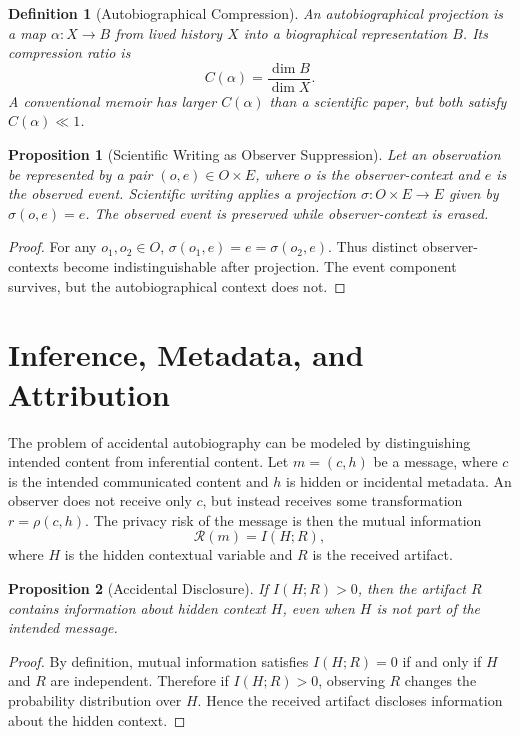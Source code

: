 \documentclass[11pt]{article}
\theoremstyle{plain}
\newtheorem{definition}{Definition}[section]
\newtheorem{proposition}{Proposition}[section]
\begin{document}
\begin{definition}[Autobiographical Compression]
An autobiographical projection is a map $\alpha : X \to B$ from lived history $X$ into a biographical representation $B$. Its compression ratio is
\[
C(\alpha) = \frac{\dim B}{\dim X}.
\]
A conventional memoir has larger $C(\alpha)$ than a scientific paper, but both satisfy $C(\alpha) \ll 1$.
\end{definition}

\begin{proposition}[Scientific Writing as Observer Suppression]
Let an observation be represented by a pair $(o,e) \in O \times E$, where $o$ is the observer-context and $e$ is the observed event. Scientific writing applies a projection $\sigma : O \times E \to E$ given by $\sigma(o,e) = e$. The observed event is preserved while observer-context is erased.
\end{proposition}
\begin{proof}
For any $o_1, o_2 \in O$, $\sigma(o_1, e) = e = \sigma(o_2, e)$. Thus distinct observer-contexts become indistinguishable after projection. The event component survives, but the autobiographical context does not.
\end{proof}

\section{Inference, Metadata, and Attribution}

The problem of accidental autobiography can be modeled by distinguishing intended content from inferential content. Let $m = (c,h)$ be a message, where $c$ is the intended communicated content and $h$ is hidden or incidental metadata. An observer does not receive only $c$, but instead receives some transformation $r = \rho(c,h)$. The privacy risk of the message is then the mutual information
\[
\mathcal{R}(m) = I(H; R),
\]
where $H$ is the hidden contextual variable and $R$ is the received artifact.

\begin{proposition}[Accidental Disclosure]
If $I(H;R) > 0$, then the artifact $R$ contains information about hidden context $H$, even when $H$ is not part of the intended message.
\end{proposition}
\begin{proof}
By definition, mutual information satisfies $I(H;R)=0$ if and only if $H$ and $R$ are independent. Therefore if $I(H;R)>0$, observing $R$ changes the probability distribution over $H$. Hence the received artifact discloses information about the hidden context.
\end{proof}
\end{document}
